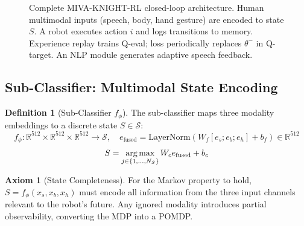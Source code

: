 \documentclass[12pt,a4paper]{article}
\theoremstyle{definition}
\newtheorem{definition}{Definition}[section]
\newtheorem{axiom}{Axiom}[section]
\theoremstyle{plain}
\theoremstyle{remark}
\newcommand{\R}{\mathbb{R}}
\newcommand{\LN}{\mathrm{LayerNorm}}
\newcommand{\argmax}{\operatornamewithlimits{arg\,max}}
\begin{document}
\begin{figure}[H]
{
}
\caption{Complete MIVA-KNIGHT-RL closed-loop architecture. Human multimodal inputs (speech, body, hand gesture) are encoded to state $S$. A robot executes action $i$ and logs transitions to memory. Experience replay trains Q-eval; loss periodically replaces $\theta^-$ in Q-target. An NLP module generates adaptive speech feedback.}
\label{fig:full_rl_loop}
\end{figure}

\subsection{Sub-Classifier: Multimodal State Encoding}

\begin{definition}[Sub-Classifier $f_\phi$]
The sub-classifier maps three modality embeddings to a discrete state $S \in \mathcal{S}$:
\[
  f_\phi : \R^{512} \times \R^{512} \times \R^{512} \to \mathcal{S}, \quad
  e_{\text{fused}} = \LN\!\left(W_f [e_s; e_b; e_h] + b_f\right) \in \R^{512}
\]
\[
  S = \argmax_{j \in \{1,\ldots,N_S\}} W_c e_{\text{fused}} + b_c
\]
\end{definition}

\begin{axiom}[State Completeness]
For the Markov property to hold, $S = f_\phi(x_s, x_b, x_h)$ must encode all information from the three input channels relevant to the robot's future. Any ignored modality introduces partial observability, converting the MDP into a POMDP.
\end{axiom}
\end{document}
